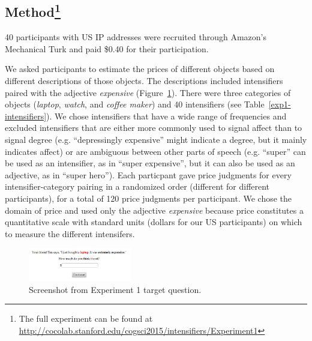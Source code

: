 \documentclass[10pt,letterpaper]{article}
\newcommand{\w}[1]{\emph{#1}}
\begin{document}
\subsection{Method\footnote{The full experiment can be found at \url{http://cocolab.stanford.edu/cogsci2015/intensifiers/Experiment1}}}

40 participants with US IP addresses were recruited through Amazon's Mechanical Turk and paid \$0.40 for their participation.

We asked participants to estimate the prices of different objects based on different descriptions of those objects. The descriptions included intensifiers paired with the adjective \w{expensive} (Figure~\ref{exp1-q}).
There were three categories of objects (\emph{laptop}, \emph{watch}, and \emph{coffee maker}) and 40 intensifiers (see Table~\ref{exp1-intensifiers}).
We chose intensifiers that have a wide range of frequencies and excluded intensifiers that are either more commonly used to signal affect than to signal degree (e.g. ``depressingly expensive'' might indicate a degree, but it mainly indicates affect) or are ambiguous between other parts of speech (e.g. ``super'' can be used as an intensifier, as in ``super expensive'', but it can also be used as an adjective, as in ``super hero'').
Each particpant gave price judgments for every intensifier-category pairing in a randomized order (different for different participants), for a total of 120 price judgments per participant.
We chose the domain of price and used only the adjective \w{expensive} because price constitutes a quantitative scale with standard units (dollars for our US participants) on which to measure the different intensifers.

\begin{figure}[htb]
\begin{center}
\includegraphics[width=0.4\textwidth]{analysis_files_for_writeup/images/exp1-q.png}
\end{center}
\caption{Screenshot from Experiment 1 target question.} 
\label{exp1-q}
\end{figure}
\end{document}
